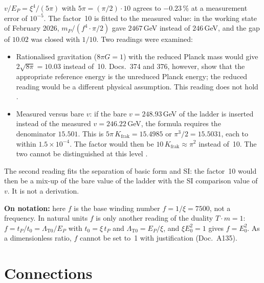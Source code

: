 $v/E_P=\xi^4/(5\pi)$ with $5\pi=(\pi/2)\cdot10$ agrees to $-0.23\,\%$ at a measurement error of
$10^{-5}$. The factor~10 is fitted to the measured value: in the working state of February 2026,
$m_P/(f^4\cdot\pi/2)$ gave $2467$\,GeV instead of $246$\,GeV, and the gap of $10.02$ was closed with
$1/10$. Two readings were examined:
\begin{itemize}[leftmargin=*,itemsep=1pt]
\item Rationalised gravitation ($8\pi G=1$) with the reduced Planck mass would give
  $2\sqrt{8\pi}=10.03$ instead of~10. Docs.~374 and 376, however, show that the appropriate
  reference energy is the unreduced Planck energy; the reduced reading would be a different
  physical assumption. This reading does not hold \XM.
\item Measured versus bare $v$: if the bare $v=248.93$\,GeV of the ladder is inserted instead of
  the measured $v=246.22$\,GeV, the formula requires the denominator $15.501$. This is
  $5\pi\,K_{\text{frak}}=15.4985$ or $\pi^3/2=15.5031$, each to within $1.5\times10^{-4}$. The
  factor would then be $10\,K_{\text{frak}}\approx\pi^2$ instead of~10. The two cannot be
  distinguished at this level \SM.
\end{itemize}
The second reading fits the separation of basic form and SI: the factor~10 would then be a mix-up
of the bare value of the ladder with the SI comparison value of $v$. It is not a derivation.

\noindent\textbf{On notation:} here $f$ is the base winding number $f = 1/\xi = 7500$, not a frequency. In natural units $f$ is only another reading of the duality $T\cdot m = 1$: $f = t_P/t_0 = \Lambda_{\text{T0}}/E_P$ with $t_0 = \xi\,t_P$ and $\Lambda_{\text{T0}} = E_P/\xi$, and $\xi E_0^2 = 1$ gives $f = E_0^2$. As a dimensionless ratio, $f$ cannot be set to~1 with justification (Doc.~A135).

\section{Connections}

